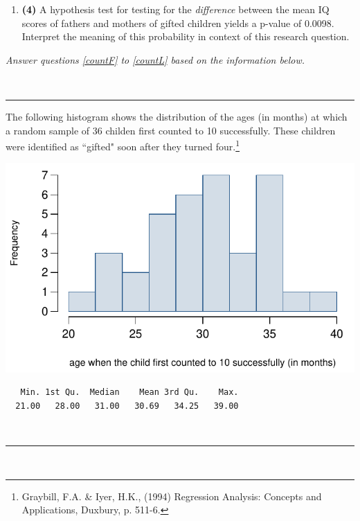 \documentclass[11pt]{article}
\newcommand{\soln}[1]{ \vspace{1.35cm} }
\newcommand{\pts}[1]{ \textbf{{\footnotesize \textcolor{black}{(#1)}}} }	%
\begin{document}
\begin{enumerate}
\begin{enumerate}
\item \pts{4} A hypothesis test for testing for the \emph{difference} between the mean IQ scores of fathers and mothers of gifted children yields a p-value of 0.0098. Interpret the meaning of this probability in context of this research question.

\soln{Point estimate: $\bar{x}_F - \bar{x}_M = 114.8 - 118.2 = -3.4$\\
$\:$ \\
If in fact fathers and mothers of gifted children have on average the same IQ score, the probability of getting a sample of 36 gifted children where the difference between the average IQ scores of fathers and mothers is 3.4 points or more is 0.0098.}

\end{enumerate}
%

\pagebreak

\begin{center}
\textit{Answer questions \ref{countF} to \ref{countL} based on the information below.}
\end{center}
$\:$
\hrule
The following histogram shows the distribution of the ages (in months) at which a random sample of 36 childen first counted to 10 successfully. These children were identified as ``gifted" soon after they turned four.\footnote{Graybill, F.A. \& Iyer, H.K., (1994) Regression Analysis: Concepts and Applications, Duxbury, p. 511-6.}

\begin{minipage}[c]{0.5\textwidth}
\begin{center}
\includegraphics[width=\textwidth]{figures/gifted/count_hist}
\end{center}
\end{minipage}
\begin{minipage}[c]{0.5\textwidth}
\begin{center}
{\footnotesize
\begin{verbatim}
   Min. 1st Qu.  Median    Mean 3rd Qu.    Max. 
  21.00   28.00   31.00   30.69   34.25   39.00 
\end{verbatim}
}\end{center}
\end{minipage}
$\:$ \\
\hrule
$\:$


\end{enumerate}
\end{document}
